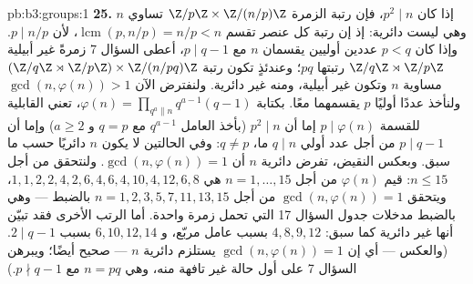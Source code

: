 \begin{solution}{pb:b3:groups:1}
\textbf{25.} إذا كان $p^2 \mid n$، فإن رتبة الزمرة $\Z/p\Z \times
\Z/(n/p)\Z$ تساوي
$n$ وهي ليست دائرية: إذ إن رتبة كل عنصر تقسم $\operatorname{lcm}(p, n/p) = n/p < n$، لأن
$p \mid n/p$. وإذا كان $p < q$ عددين أوليين يقسمان $n$ مع
$p \mid
q - 1$، أعطى السؤال 7 زمرةً غير أبيلية $\Z/q\Z \rtimes
\Z/p\Z$ رتبتها $pq$؛
وعندئذٍ تكون رتبة $(\Z/q\Z \rtimes \Z/p\Z) \times
\Z/(n/pq)\Z$ مساوية $n$ وتكون غير أبيلية، ومنه
غير دائرية. ولنفترض الآن $\gcd(n, \varphi(n)) > 1$ ولنأخذ عددًا أوليًا $p$ يقسمهما
معًا. بكتابة $\varphi(n) = \prod_{q^a \parallel
n} q^{a-1}(q - 1)$، تعني القابلية للقسمة $p \mid \varphi(n)$ إما أن
$p^2 \mid n$ (بأخذ العامل $q^{a-1}$ مع $q = p$ و $a \geq 2$)
وإما أن $p \mid q - 1$ من أجل عدد أولي $q \mid n$ ما، $q
\neq p$:
وفي الحالتين لا يكون $n$ دائريًا حسب ما سبق. وبعكس النقيض، تفرض
دائرية $n$ أن $\gcd(n, \varphi(n)) = 1$. ولنتحقق من أجل $n \leq 15$: قيم
$\varphi(n)$ من أجل $n = 1,
\dots, 15$ هي $1, 1, 2, 2, 4, 2, 6, 4, 6, 4, 10, 4, 12, 6,
8$، ويتحقق $\gcd(n, \varphi(n)) = 1$ من أجل
$n = 1, 2, 3, 5,
7, 11, 13, 15$ بالضبط --- وهي بالضبط مدخلات جدول السؤال 17 التي تحمل
زمرة واحدة. أما الرتب الأخرى فقد تبيّن أنها غير دائرية كما سبق:
$4, 8, 9, 12$ بسبب عامل مربّع، و $6, 10, 12, 14$ بسبب
$2 \mid q - 1$. (والعكس --- أي إن $\gcd(n, \varphi(n)) = 1$ يستلزم دائرية $n$ ---
صحيح أيضًا؛ ويبرهن السؤال 7 على أول حالة غير تافهة منه، وهي
$n = pq$ مع $p \nmid q - 1$.)
\end{solution}
